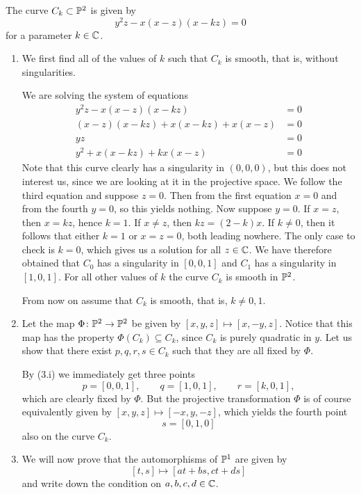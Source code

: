 \documentclass[a4paper, 12pt]{article}
\begin{document}
 \begin{Exercise}
     The curve $C_k \subset \P^2$ is given by
     \[
         y^2z - x(x - z)(x - kz) = 0
     \]
     for a parameter $k \in \C$.
     \begin{enumerate}[label=(\roman*)]
         \item We first find all of the values of $k$ such that $C_k$ is smooth,
             that is, without singularities.

             We are solving the system of equations
             \begin{align*}
                 y^2z - x(x-z)(x-kz) &= 0 \\
                 (x-z)(x-kz) + x(x-kz) + x(x-z) &= 0 \\
                 yz &= 0 \\
                 y^2 + x(x-kz) + kx(x-z) &= 0
             \end{align*}
             Note that this curve clearly has a singularity in $(0, 0, 0)$, but
             this does not interest us, since we are looking at it in the
             projective space.  We follow the third equation and suppose $z=0$.
             Then from the first equation $x=0$ and from the fourth $y=0$, so
             this yields nothing.  Now suppose $y = 0$.  If $x = z$, then $x =
             kz$, hence $k=1$.  If $x \neq z$, then $kz =(2-k)x$.  If $k \neq
             0$, then it follows that either $k=1$ or $x = z = 0$, both leading
             nowhere.  The only case to check is $k=0$, which gives us a
             solution for all $z \in \C$.  We have therefore obtained that
             $C_0$ has a singularity in $[0,0,1]$ and $C_1$ has a singularity
             in $[1,0,1]$.  For all other values of $k$ the curve $C_k$ is
             smooth in $\P^2$.

             From now on assume that $C_k$ is smooth, that is, $k \neq 0, 1$.
         \item Let the map $\Phi \colon \P^2 \to \P^2$ be given by $[x, y, z] \mapsto [x, -y, z]$.
             Notice that this map has the property $\Phi(C_k) \subseteq C_k$,
             since $C_k$ is purely quadratic in $y$.  Let us show that there
             exist $p, q, r, s \in C_k$ such that they are all fixed by $\Phi$.

             By (3.i) we immediately get three points
             \[
                 p = [0, 0, 1], \quad\quad q = [1, 0, 1], \quad\quad r = [k, 0, 1],
             \]
             which are clearly fixed by $\Phi$.
             But the projective transformation $\Phi$ is of course equivalently
             given by $[x, y, z] \mapsto [-x, y, -z]$, which yields the fourth
             point
             \[
                 s = [0, 1, 0]
             \]
             also on the curve $C_k$.
         \item We will now prove that the automorphisms of $\P^1$ are given by
             \[
                 [t,s] \mapsto [at+bs, ct+ds]
             \]
             and write down the condition on $a, b, c, d \in \C$.


\end{enumerate}
\end{Exercise}
\end{document}
